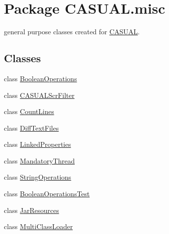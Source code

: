 \hypertarget{namespace_c_a_s_u_a_l_1_1misc}{\section{Package C\-A\-S\-U\-A\-L.\-misc}
\label{namespace_c_a_s_u_a_l_1_1misc}
}


general purpose classes created for \hyperlink{namespace_c_a_s_u_a_l}{C\-A\-S\-U\-A\-L}.  


\subsection*{Classes}
\begin{DoxyCompactItemize}
\item 
class \hyperlink{class_c_a_s_u_a_l_1_1misc_1_1_boolean_operations}{Boolean\-Operations}
\item 
class \hyperlink{class_c_a_s_u_a_l_1_1misc_1_1_c_a_s_u_a_l_scr_filter}{C\-A\-S\-U\-A\-L\-Scr\-Filter}
\item 
class \hyperlink{class_c_a_s_u_a_l_1_1misc_1_1_count_lines}{Count\-Lines}
\item 
class \hyperlink{class_c_a_s_u_a_l_1_1misc_1_1_diff_text_files}{Diff\-Text\-Files}
\item 
class \hyperlink{class_c_a_s_u_a_l_1_1misc_1_1_linked_properties}{Linked\-Properties}
\item 
class \hyperlink{class_c_a_s_u_a_l_1_1misc_1_1_mandatory_thread}{Mandatory\-Thread}
\item 
class \hyperlink{class_c_a_s_u_a_l_1_1misc_1_1_string_operations}{String\-Operations}
\item 
class \hyperlink{class_c_a_s_u_a_l_1_1misc_1_1_boolean_operations_test}{Boolean\-Operations\-Test}
\item 
class \hyperlink{class_c_a_s_u_a_l_1_1misc_1_1_jar_resources}{Jar\-Resources}
\item 
class \hyperlink{class_c_a_s_u_a_l_1_1misc_1_1_multi_class_loader}{Multi\-Class\-Loader}
\end{DoxyCompactItemize}


